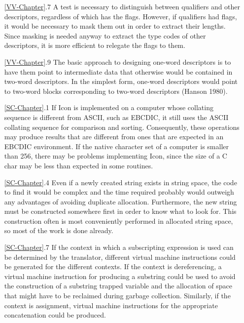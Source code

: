 \begin{itemize}
\goodbreak\item[\ref*{VV-Chapter}.7]
A test is necessary to distinguish between qualifiers and other descriptors,
regardless of which has the flags. However, if qualifiers had flags, it
would be necessary to mask them out in order to extract their lengths.
Since masking is needed anyway to extract the type codes of other
descriptors, it is more efficient to relegate the flags to them.

\goodbreak\item[\ref*{VV-Chapter}.9]
 The basic approach to designing one-word descriptors is to have them
point to intermediate data that otherwise would be contained in two-word
descriptors. In the simplest form, one-word descriptors would point to
two-word blocks corresponding to two-word descriptors (Hanson 1980).

\goodbreak\item[\ref*{SC-Chapter}.1]
 If Icon is implemented on a computer whose collating sequence is different 
from ASCII, such as EBCDIC, it still uses the ASCII collating
sequence for comparison and sorting. Consequently, these operations may
produce results that are different from ones that are expected in an
EBCDIC environment. If the native character set of a computer is smaller
than 256, there may be problems implementing Icon, since the size of a C
char may be less than expected in some routines.

\goodbreak\item[\ref*{SC-Chapter}.4]
Even if a newly created string exists in string space, the code to find it
would be complex and the time required probably would outweigh any
advantages of avoiding duplicate allocation. Furthermore, the new string
must be constructed somewhere first in order to know what to look for.
This construction often is most conveniently performed in allocated string
space, so most of the work is done already.

\goodbreak\item[\ref*{SC-Chapter}.7]
If the context in which a subscripting expression is used can be determined
by the translator, different virtual machine instructions could be
generated for the different contexts. If the context is dereferencing, a virtual
machine instruction for producing a substring could be used to avoid
the construction of a substring trapped variable and the allocation of
space that might have to be reclaimed during garbage collection. Similarly,
if the context is assignment, virtual machine instructions for the
appropriate concatenation could be produced.


\end{itemize}
